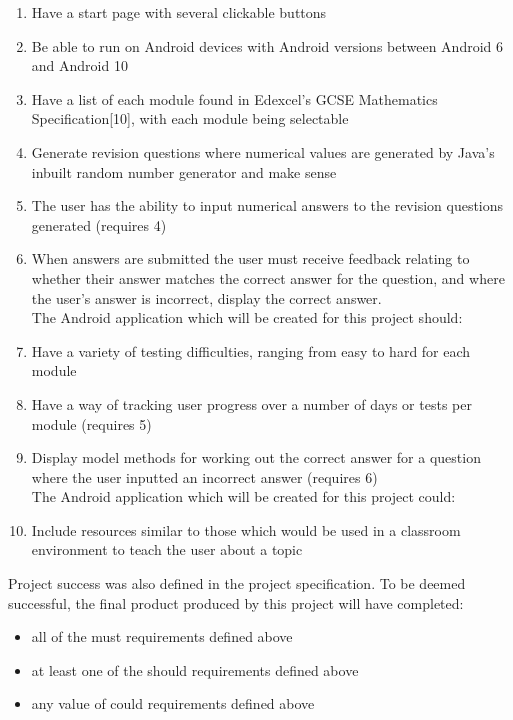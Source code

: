 \documentclass{article}
\begin{document}
\begin{enumerate}
	\item Have a start page with several clickable buttons
	\item Be able to run on Android devices with Android versions between Android 6 and Android 10
	\item Have a list of each module found in Edexcel's GCSE Mathematics Specification[10], with each module being selectable
	\item Generate revision questions where numerical values are generated by Java's inbuilt random number generator and make sense
	\item The user has the ability to input numerical answers to the revision questions generated (requires 4)
	\item When answers are submitted the user must receive feedback relating to whether	their answer matches the correct answer for the question, and where the user’s answer is incorrect, display the correct answer. \\
	
	The Android application which will be created for this project should:
	\item Have a variety of testing difficulties, ranging from easy to hard for each module
	\item Have a way of tracking user progress over a number of days or tests per module (requires 5)
	\item Display model methods for working out the correct answer for a question where the user inputted an incorrect answer (requires 6) \\
	
	The Android application which will be created for this project could:
	\item Include resources similar to those which would be used in a classroom environment to teach the user about a topic
\end{enumerate}

Project success was also defined in the project specification. To be deemed successful, the final product produced by this project will have completed: 

\begin{itemize}
	\item all of the must requirements defined above
	\item at least one of the should requirements defined above
	\item any value of could requirements defined above
\end{itemize}
\end{document}
